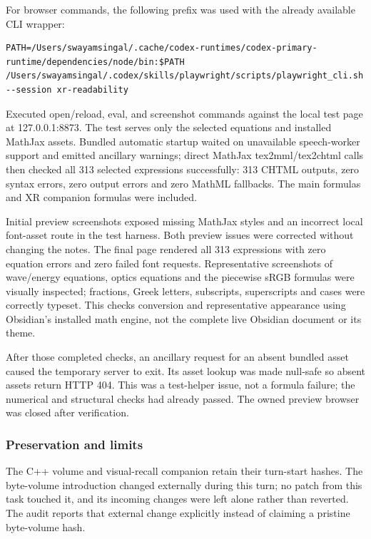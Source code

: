 For browser commands, the following prefix was used with the already available CLI wrapper:

\begin{verbatim}
PATH=/Users/swayamsingal/.cache/codex-runtimes/codex-primary-runtime/dependencies/node/bin:$PATH /Users/swayamsingal/.codex/skills/playwright/scripts/playwright_cli.sh --session xr-readability
\end{verbatim}

Executed open/reload, eval, and screenshot commands against the local test page at 127.0.0.1:8873. The test serves only the selected equations and installed MathJax assets. Bundled automatic startup waited on unavailable speech-worker support and emitted ancillary warnings; direct MathJax tex2mml/tex2chtml calls then checked all 313 selected expressions successfully: 313 CHTML outputs, zero syntax errors, zero output errors and zero MathML fallbacks. The main formulas and XR companion formulas were included.

Initial preview screenshots exposed missing MathJax styles and an incorrect local font-asset route in the test harness. Both preview issues were corrected without changing the notes. The final page rendered all 313 expressions with zero equation errors and zero failed font requests. Representative screenshots of wave/energy equations, optics equations and the piecewise sRGB formulas were visually inspected; fractions, Greek letters, subscripts, superscripts and cases were correctly typeset. This checks conversion and representative appearance using Obsidian's installed math engine, not the complete live Obsidian document or its theme.

After those completed checks, an ancillary request for an absent bundled asset caused the temporary server to exit. Its asset lookup was made null-safe so absent assets return HTTP 404. This was a test-helper issue, not a formula failure; the numerical and structural checks had already passed. The owned preview browser was closed after verification.

\subsubsection{Preservation and limits}\label{appendix-a103e7846d21-preservation-and-limits}

\hypertarget{appendix-a103e7846d21-preservation-and-limits}{}

The C++ volume and visual-recall companion retain their turn-start hashes. The byte-volume introduction changed externally during this turn; no patch from this task touched it, and its incoming changes were left alone rather than reverted. The audit reports that external change explicitly instead of claiming a pristine byte-volume hash.

